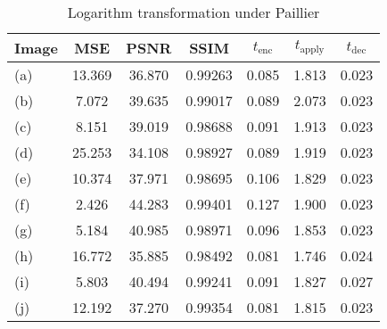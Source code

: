 \begin{table}[h]
	\centering
	\caption{Logarithm transformation under Paillier}
	\label{tbl:log-pal}
    \begin{tabular}{lcccccc}
        \toprule
        Image & MSE  & PSNR & SSIM & $t_\text{enc}$ & $t_\text{apply}$ & $t_\text{dec}$ \\ \midrule
		(a) & 13.369 & 36.870 & 0.99263 & 0.085 & 1.813 & 0.023 \\
		(b) & 7.072 & 39.635 & 0.99017 & 0.089 & 2.073 & 0.023 \\
		(c) & 8.151 & 39.019 & 0.98688 & 0.091 & 1.913 & 0.023 \\
		(d) & 25.253 & 34.108 & 0.98927 & 0.089 & 1.919 & 0.023 \\
		(e) & 10.374 & 37.971 & 0.98695 & 0.106 & 1.829 & 0.023 \\
		(f) & 2.426 & 44.283 & 0.99401 & 0.127 & 1.900 & 0.023 \\
		(g) & 5.184 & 40.985 & 0.98971 & 0.096 & 1.853 & 0.023 \\
		(h) & 16.772 & 35.885 & 0.98492 & 0.081 & 1.746 & 0.024 \\
		(i) & 5.803 & 40.494 & 0.99241 & 0.091 & 1.827 & 0.027 \\
		(j) & 12.192 & 37.270 & 0.99354 & 0.081 & 1.815 & 0.023 \\
		\bottomrule
        \end{tabular}
\end{table}
